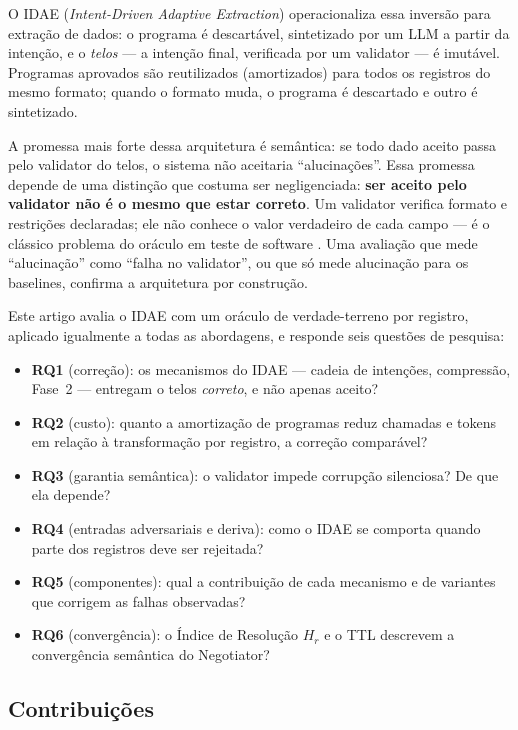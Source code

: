 \documentclass[sigconf,nonacm]{acmart}
\begin{document}
O IDAE (\textit{Intent-Driven Adaptive Extraction}) operacionaliza essa inversão para extração de dados: o programa é descartável, sintetizado por um LLM a partir da intenção, e o \textit{telos} --- a intenção final, verificada por um validator --- é imutável. Programas aprovados são reutilizados (amortizados) para todos os registros do mesmo formato; quando o formato muda, o programa é descartado e outro é sintetizado.

A promessa mais forte dessa arquitetura é semântica: se todo dado aceito passa pelo validator do telos, o sistema não aceitaria ``alucinações''. Essa promessa depende de uma distinção que costuma ser negligenciada: \textbf{ser aceito pelo validator não é o mesmo que estar correto}. Um validator verifica formato e restrições declaradas; ele não conhece o valor verdadeiro de cada campo --- é o clássico problema do oráculo em teste de software \cite{barr2015oracle}. Uma avaliação que mede ``alucinação'' como ``falha no validator'', ou que só mede alucinação para os baselines, confirma a arquitetura por construção.

Este artigo avalia o IDAE com um oráculo de verdade-terreno por registro, aplicado igualmente a todas as abordagens, e responde seis questões de pesquisa:

\begin{itemize}
\item \textbf{RQ1} (correção): os mecanismos do IDAE --- cadeia de intenções, compressão, Fase~2 --- entregam o telos \textit{correto}, e não apenas aceito?
\item \textbf{RQ2} (custo): quanto a amortização de programas reduz chamadas e tokens em relação à transformação por registro, a correção comparável?
\item \textbf{RQ3} (garantia semântica): o validator impede corrupção silenciosa? De que ela depende?
\item \textbf{RQ4} (entradas adversariais e deriva): como o IDAE se comporta quando parte dos registros deve ser rejeitada?
\item \textbf{RQ5} (componentes): qual a contribuição de cada mecanismo e de variantes que corrigem as falhas observadas?
\item \textbf{RQ6} (convergência): o Índice de Resolução $H_r$ e o TTL descrevem a convergência semântica do Negotiator?
\end{itemize}

\subsection{Contribuições}
\end{document}
